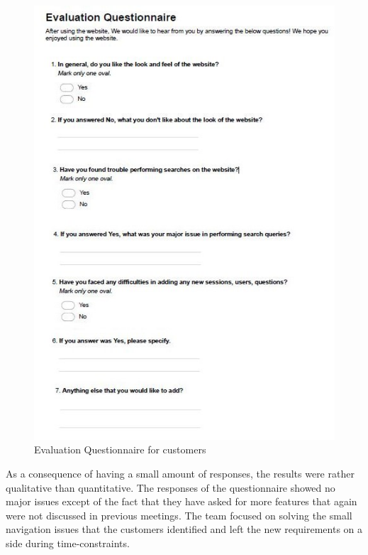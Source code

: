 \documentclass{l3proj}
\begin{document}
\begin{figure}
 \centerline{\includegraphics[width=\textwidth, height=\textheight, keepaspectratio]{evalQuestCustomers.jpg}}
 \caption{Evaluation Questionnaire for customers }
\end{figure}

As a consequence of having a small amount of responses, the results were rather qualitative than quantitative. The responses of the questionnaire showed no major issues except of the fact that they have asked for more features that again were not discussed in previous meetings. The team focused on solving the small navigation issues that the customers identified and left the new requirements on a side during time-constraints. 





\end{document}
